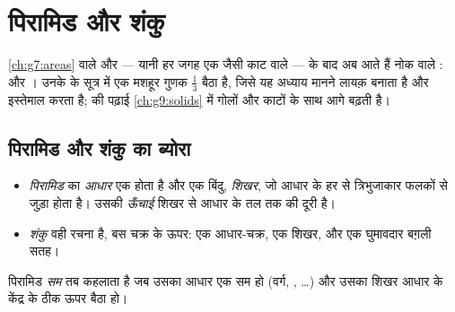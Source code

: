 \chapter{पिरामिड और शंकु}\label{ch:g8:solids}

\cref{ch:g7:areas} वाले  और  --- यानी हर जगह एक जैसी
काट वाले  --- के बाद अब आते हैं नोक वाले :  और ।
उनके  के सूत्र में एक मशहूर गुणक $\frac13$ बैठा है, जिसे यह
अध्याय मानने लायक़ बनाता है और इस्तेमाल करता है;  की पढ़ाई
\cref{ch:g9:solids} में गोलों और काटों के साथ आगे बढ़ती है।

\section{पिरामिड और शंकु का ब्योरा}

\begin{definition}[पिरामिड, शंकु]\label{def:g8:solids:def}
\begin{itemize}
  \item \emph{पिरामिड} का \emph{आधार} एक  होता
        है और एक बिंदु, \emph{शिखर}, जो आधार के हर  से
        त्रिभुजाकार फलकों से जुड़ा होता है। उसकी \emph{ऊँचाई} शिखर
        से आधार के तल तक की दूरी है।
  \item \emph{शंकु} वही रचना है, बस चक्र के ऊपर: एक
        आधार-चक्र, एक शिखर, और एक घुमावदार बग़ली सतह।
\end{itemize}
पिरामिड \emph{सम} तब कहलाता है जब उसका आधार एक सम  हो (वर्ग,
, \dots) और उसका शिखर आधार के केंद्र के ठीक ऊपर बैठा
हो।
\end{definition}


